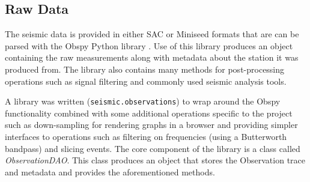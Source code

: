\documentclass[../report.tex]{subfiles}
\begin{document}
\subsection{Raw Data}
	The seismic data is provided in either SAC or Miniseed formats that are can be parsed with the Obspy Python library \citep{obspy}.  Use of this library produces an object containing the raw measurements along with metadata about the station it was produced from.  The library also contains many methods for post-processing operations such as signal filtering and commonly used seismic analysis tools.
	
	A library was written (\verb|seismic.observations|) to wrap around the Obspy functionality combined with some additional operations specific to the project such as down-sampling for rendering graphs in a browser and providing simpler interfaces to operations such as filtering on frequencies (using a Butterworth bandpass) and slicing events.  The core component of the library is a class called \textit{ObservationDAO}.  This class produces an object that stores the Observation trace and metadata and provides the aforementioned methods.
\end{document}
